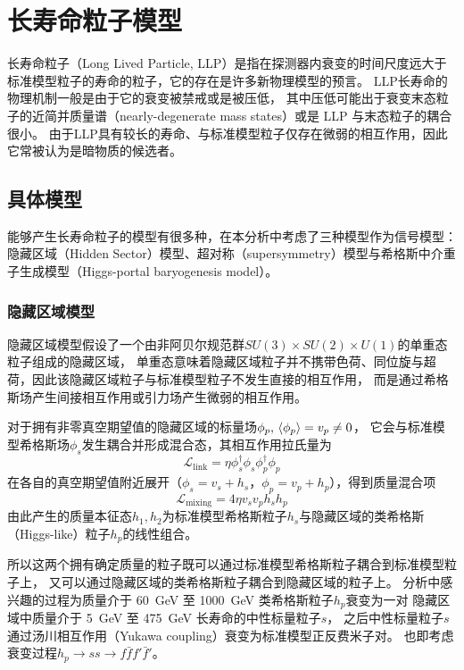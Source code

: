 
\chapter{长寿命粒子模型}

长寿命粒子（Long Lived Particle, LLP）是指在探测器内衰变的时间尺度远大于标准模型粒子的寿命的粒子，它的存在是许多新物理模型的预言。
LLP长寿命的物理机制一般是由于它的衰变被禁戒或是被压低，
其中压低可能出于衰变末态粒子的近简并质量谱（nearly-degenerate mass states）或是 LLP 与末态粒子的耦合很小。
由于LLP具有较长的寿命、与标准模型粒子仅存在微弱的相互作用，因此它常被认为是暗物质的候选者。


\section{具体模型}
能够产生长寿命粒子的模型有很多种，在本分析中考虑了三种模型作为信号模型：
隐藏区域（Hidden Sector）模型、超对称（supersymmetry）模型与希格斯中介重子生成模型（Higgs-portal baryogenesis model）。


\subsection{隐藏区域模型}
隐藏区域模型假设了一个由非阿贝尔规范群$SU(3)\times SU(2) \times U(1)$的单重态粒子组成的隐藏区域，
单重态意味着隐藏区域粒子并不携带色荷、同位旋与超荷，因此该隐藏区域粒子与标准模型粒子不发生直接的相互作用，
而是通过希格斯场产生间接相互作用或引力场产生微弱的相互作用。
\cite{hidden_sector}

对于拥有非零真空期望值的隐藏区域的标量场$\phi_p, \,\expval{\phi_p}=v_p \neq 0$，
它会与标准模型希格斯场$\phi_s$发生耦合并形成混合态，其相互作用拉氏量为
\begin{equation}
    \mathcal{L}_\text{link} = \eta \phi^\dagger_s \phi_s \phi^\dagger_p \phi_p
\end{equation}
在各自的真空期望值附近展开（$\phi_s = v_s + h_s$，$\phi_p = v_p + h_p$），得到质量混合项
\begin{equation}
    \mathcal{L}_\text{mixing} = 4 \eta v_s v_p h_s h_p
\end{equation}
由此产生的质量本征态$h_1, h_2$为标准模型希格斯粒子$h_s$与隐藏区域的类希格斯（Higgs-like）粒子$h_p$的线性组合。

所以这两个拥有确定质量的粒子既可以通过标准模型希格斯粒子耦合到标准模型粒子上，
又可以通过隐藏区域的类希格斯粒子耦合到隐藏区域的粒子上。
分析中感兴趣的过程为质量介于 \SI{60}{GeV} 至 \SI{1000}{GeV} 类希格斯粒子$h_p$衰变为一对
隐藏区域中质量介于 \SI{5}{GeV} 至 \SI{475}{GeV} 长寿命的中性标量粒子$s$，
之后中性标量粒子$s$通过汤川相互作用（Yukawa coupling）衰变为标准模型正反费米子对。
也即考虑衰变过程$h_p \rightarrow ss \rightarrow f \bar{f} f' \bar{f}'$。

